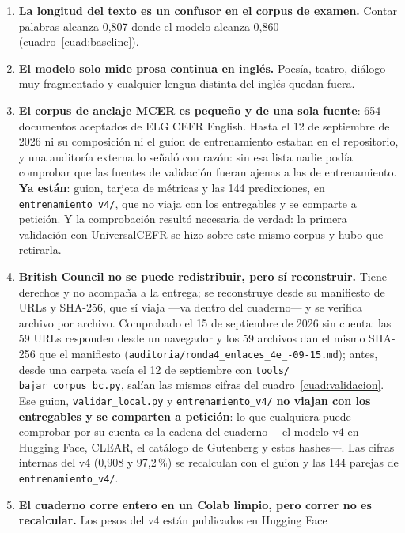 \documentclass[11pt,a4paper]{article}
\newcommand{\cod}[1]{\texttt{\small #1}}
\newcommand{\pct}{\,\%}
\begin{document}
\begin{enumerate}[leftmargin=*, itemsep=4pt]
        ese diagnóstico y el conjunto ha sido mirado y ya no es virgen.
  \item \textbf{La longitud del texto es un confusor en el corpus de examen.} Contar
        palabras alcanza 0,807 donde el modelo alcanza 0,860 (cuadro~\ref{cuad:baseline}).
  \item \textbf{El modelo solo mide prosa continua en inglés.} Poesía, teatro, diálogo muy
        fragmentado y cualquier lengua distinta del inglés quedan fuera.
  \item \textbf{El corpus de anclaje MCER es pequeño y de una sola fuente}: 654 documentos
        aceptados de ELG CEFR English. Hasta el 12 de septiembre de 2026 ni su composición
        ni el guion de entrenamiento estaban en el repositorio, y una auditoría externa lo
        señaló con razón: sin esa lista nadie podía comprobar que las fuentes de validación
        fueran ajenas a las de entrenamiento. \textbf{Ya están}: guion, tarjeta de métricas y
        las 144 predicciones, en \cod{entrenamiento\_v4/}, que no viaja con los
        entregables y se comparte a petición. Y la comprobación resultó necesaria
        de verdad: la primera validación con UniversalCEFR se hizo sobre este mismo corpus y
        hubo que retirarla.
  \item \textbf{British Council no se puede redistribuir, pero sí reconstruir.} Tiene
        derechos y no acompaña a la entrega; se reconstruye desde su manifiesto de URLs y
        SHA-256, que sí viaja —va dentro del cuaderno— y se verifica archivo por archivo.
        Comprobado el 15 de septiembre de 2026 sin cuenta: las 59 URLs responden desde un
        navegador y los 59 archivos dan el mismo SHA-256 que el manifiesto
        (\cod{auditoria/\allowbreak ronda4\_enlaces\_4e\_-09-15.md}); antes,
        desde una carpeta vacía el 12 de septiembre con \cod{tools/\allowbreak
        bajar\_corpus\_bc.py}, salían las mismas cifras del cuadro~\ref{cuad:validacion}.
        Ese guion, \cod{validar\_local.py} y \cod{entrenamiento\_v4/} \textbf{no viajan con
        los entregables y se comparten a petición}: lo que cualquiera puede comprobar por su
        cuenta es la cadena del cuaderno —el modelo v4 en Hugging Face, CLEAR, el catálogo de
        Gutenberg y estos hashes—. Las cifras internas del v4 (0,908 y 97,2\pct) se
        recalculan con el guion y las 144 parejas de \cod{entrenamiento\_v4/}.
  \item \textbf{El cuaderno corre entero en un Colab limpio, pero correr no es
        recalcular.} Los pesos del v4 están publicados en Hugging Face

\end{enumerate}
\end{document}
